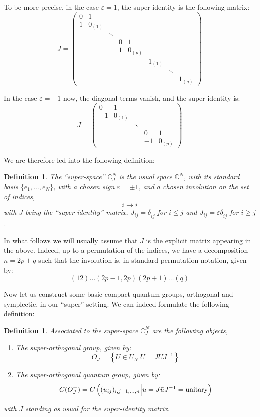 \documentclass[12pt]{amsbook}
\newtheorem{definition}[theorem]{Definition}
\begin{document}
To be more precise, in the case $\varepsilon=1$, the super-identity is the following matrix:
$$J=\begin{pmatrix}
0&1\ \ \ \\
1&0_{(1)}\\
&&\ddots\\
&&&0&1\ \ \ \\
&&&1&0_{(p)}\\
&&&&&1_{(1)}\\
&&&&&&\ddots\\
&&&&&&&1_{(q)}
\end{pmatrix}$$

In the case $\varepsilon=-1$ now, the diagonal terms vanish, and the super-identity is:
$$J=\begin{pmatrix}
0&1\ \ \ \\
-1&0_{(1)}\\
&&\ddots\\
&&&0&1\ \ \ \\
&&&-1&0_{(p)}
\end{pmatrix}$$

We are therefore led into the following definition:


\begin{definition}
The ``super-space'' $\mathbb C^N_J$ is the usual space $\mathbb C^N$, with its standard basis $\{e_1,\ldots,e_N\}$, with a chosen sign $\varepsilon=\pm 1$, and a chosen involution on the set of indices,
$$i\to\bar{i}$$
with $J$ being the ``super-identity'' matrix, $J_{ij}=\delta_{i\bar{j}}$ for $i\leq j$ and $J_{ij}=\varepsilon\delta_{i\bar{j}}$ for $i\geq j$.
\end{definition}

In what follows we will usually assume that $J$ is the explicit matrix appearing in the above. Indeed, up to a permutation of the indices, we have a decomposition $n=2p+q$ such that the involution is, in standard permutation notation, given by:
$$(12)\ldots (2p-1,2p)(2p+1)\ldots (q)$$

Now let us construct some basic compact quantum groups, orthogonal and symplectic, in our ``super'' setting. We can indeed formulate the following definition:


\begin{definition}
Associated to the super-space $\mathbb C^N_J$ are the following objects,
\begin{enumerate}
\item The super-orthogonal group, given by:
$$O_J=\left\{U\in U_N\Big|U=J\bar{U}J^{-1}\right\}$$

\item The super-orthogonal quantum group, given by:
$$C(O_J^+)=C\left((u_{ij})_{i,j=1,\ldots,n}\Big|u=J\bar{u}J^{-1}={\rm unitary}\right)$$
\end{enumerate}
with $J$ standing as usual for the super-identity matrix.
\end{definition}
\end{document}
